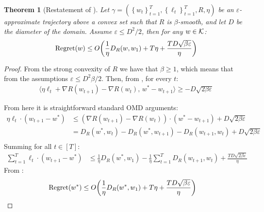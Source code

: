 \documentclass[10pt]{article}
\newtheorem*{theorem*}{Theorem}
\theoremstyle{definition}
\theoremstyle{remark}
\renewcommand{\epsilon}{\varepsilon}
\newcommand\inprod[2]{\langle #1,\,#2 \rangle}
\newcommand{\curly}[1]{ {\left\{ #1 \right\}}}
\newcommand{\roundy}[1]{ {\left( #1 \right)}}
\newcommand{\reg}{{\rm Regret}}
\begin{document}
\begin{theorem*}[Restatement of ]\label{thm:smooth upper bound}
Let $\gamma = (\curly{w_t}_{t=1}^T, \curly{\ell_t}_{t=1}^T, R, \eta)$ be an $\epsilon$-approximate trajectory above a convex set such that $R$ is $\beta$-smooth, and let $D$ be the diameter of the domain. Assume $\epsilon \le D^2/2$, then for any $w\in\mathcal K$:
\begin{align*}
    \reg(w) \le O\roundy{\frac{1}{\eta}D_R(w, w_1) + T\eta + \frac{TD\sqrt{\beta\epsilon}}{\eta}}
\end{align*}
\end{theorem*}
\begin{proof}
From the strong convexity of $R$ we have that $\beta \ge 1$, which means that from the assumptions $\epsilon \le D^2\beta/2$. Then, from , for every $t$:
\begin{align*}
    \inprod{\eta\ell_t + \nabla R(w_{t+1}) - \nabla R(w_t)}{w^* - w_{t+1}} \ge -D\sqrt{2\beta\epsilon}
\end{align*}

From here it is straightforward standard OMD arguments:
\begin{align*}
\eta \ell_t \cdot (w_{t+1}-w^*) 
&\leq (\nabla R(w_{t+1}) - \nabla R(w_{t})) \cdot (w^*-w_{t+1}) + D\sqrt{2\beta\epsilon}
\\
&=
D_R(w^*,w_t) - D_R(w^*,w_{t+1}) - D_R(w_{t+1},w_t) + D\sqrt{2\beta\epsilon} \\
\end{align*}
Summing for all $t\in[T]$:
\begin{align*}
    \sum_{t=1}^T \ell_t \cdot (w_{t+1}-w^*)
&\leq
\frac1\eta D_R(w^*,w_1) - \frac1\eta \sum_{t=1}^T D_R(w_{t+1},w_t) + \frac{TD\sqrt{2\beta\epsilon}}{\eta}
\end{align*}
From :
\begin{align*}
    \reg(w^*) &\le O\roundy{\frac{1}{\eta}D_R(w^*, w_1) + T\eta + \frac{TD\sqrt{\beta\epsilon}}{\eta}}
\end{align*}
\end{proof}
\end{document}
